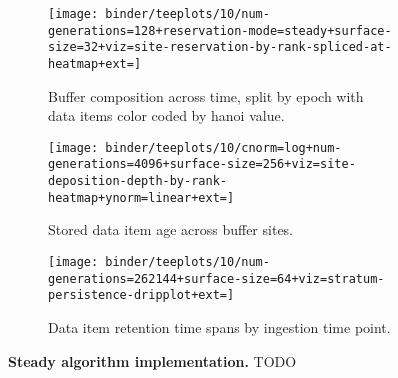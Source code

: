 \begin{figure*}[h!]
  \centering

\begin{subfigure}[b]{\linewidth}
\texttt{[image: 
binder/teeplots/10/num-generations=128+reservation-mode=steady+surface-size=32+viz=site-reservation-by-rank-spliced-at-heatmap+ext=]}
\caption{
  Buffer composition across time, split by epoch with data items color coded by hanoi value.
}
\end{subfigure}

 \begin{minipage}[]{\textwidth}
 \vspace{-2pt}
  \begin{subfigure}[t]{0.7\linewidth}
    \vspace{0pt}
    \centering
  \texttt{[image: binder/teeplots/10/cnorm=log+num-generations=4096+surface-size=256+viz=site-deposition-depth-by-rank-heatmap+ynorm=linear+ext=]}
  \end{subfigure}%
  \begin{subfigure}[t]{0.3\linewidth}
  \vspace{-2pt}
  \caption{%
    Stored data item age across buffer sites.
  }
\end{subfigure}
\end{minipage}

   \begin{minipage}[]{\textwidth}
   \vspace{-2pt}
  \begin{subfigure}[t]{0.7\linewidth}
  \vspace{0pt}
    \centering
    \texttt{[image: binder/teeplots/10/num-generations=262144+surface-size=64+viz=stratum-persistence-dripplot+ext=]}
  \end{subfigure}%
  \begin{subfigure}[t]{0.3\linewidth}
  \vspace{-2pt}
  \caption{%
    Data item retention time spans by ingestion time point.
  }
  \end{subfigure}
  \end{minipage}

\caption{%
  \textbf{Steady algorithm implementation.}
  \footnotesize
  TODO
  }
\label{fig:surf-steady-implementation}

\end{figure*}
